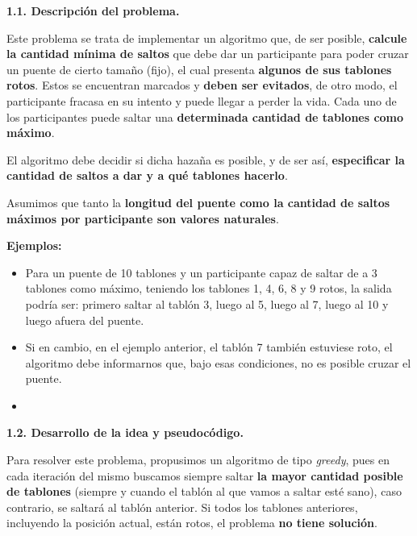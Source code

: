 \noindent
\textbf{1.1. Descripción del problema.}

\vspace*{0.3cm}

Este problema se trata de implementar un algoritmo que, de ser posible, 
\textbf{calcule la cantidad mínima de saltos} que debe dar un participante para poder cruzar un 
puente de cierto tamaño (fijo), el cual presenta \textbf{algunos de sus tablones rotos}. Estos se encuentran 
marcados y \textbf{deben ser evitados}, de otro modo, el participante fracasa en su intento y puede llegar a 
perder la vida. Cada uno de los participantes puede saltar una \textbf{determinada cantidad de tablones como máximo}. \medskip

El algoritmo debe decidir si dicha hazaña es posible, y de ser así, 
\textbf{especificar la cantidad de saltos a dar y a qué tablones hacerlo}. \medskip

Asumimos que tanto la \textbf{longitud del puente como la cantidad de saltos máximos por participante
son valores naturales}.

\vspace*{0.5cm}

\textbf{Ejemplos:}
\begin{itemize}
  \item Para un puente de 10 tablones y un participante capaz de saltar de a 3
  tablones como máximo, teniendo los tablones 1, 4, 6, 8 y 9 rotos, la salida podría ser: 
  primero saltar al tablón 3, luego al 5, luego al 7, luego al 10 y luego afuera del puente.
  \item Si en cambio, en el ejemplo anterior, el tablón 7 también estuviese roto,
  el algoritmo debe informarnos que, bajo esas condiciones, no es posible cruzar el puente.
  \item < agregar un ejemplo mas con dibujitos y cosas lindas >
\end{itemize}


\vspace*{0.75cm} \noindent



\noindent
\textbf{1.2. Desarrollo de la idea y pseudocódigo.}

\vspace*{0.3cm}

Para resolver este problema, propusimos un algoritmo de tipo \textit{greedy}, pues en cada iteración
del mismo buscamos siempre saltar \textbf{la mayor cantidad posible de tablones} (siempre y cuando el 
tablón al que vamos a saltar esté sano), caso contrario, se saltará al tablón anterior.
Si todos los tablones anteriores, incluyendo la posición actual, están rotos, el problema
\textbf{no tiene solución}.

